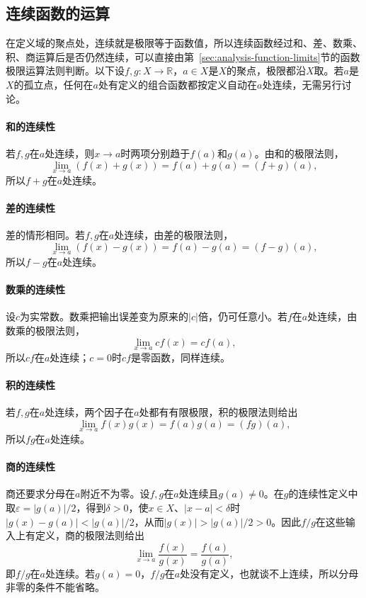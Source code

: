 \subsection{连续函数的运算}

在定义域的聚点处，连续就是极限等于函数值，所以连续函数经过和、差、数乘、积、商运算后是否仍然连续，可以直接由第~\ref{sec:analysis-function-limits}节的函数极限运算法则判断。以下设$f,g:X\to\mathbb R$，$a\in X$是$X$的聚点，极限都沿$X$取。若$a$是$X$的孤立点，任何在$a$处有定义的组合函数都按定义自动在$a$处连续，无需另行讨论。

\paragraph{和的连续性}
若$f,g$在$a$处连续，则$x\to a$时两项分别趋于$f(a)$和$g(a)$。由和的极限法则，
\[
 \lim_{x\to a}(f(x)+g(x))=f(a)+g(a)=(f+g)(a),
\]
所以$f+g$在$a$处连续。

\paragraph{差的连续性}
差的情形相同。若$f,g$在$a$处连续，由差的极限法则，
\[
 \lim_{x\to a}(f(x)-g(x))=f(a)-g(a)=(f-g)(a),
\]
所以$f-g$在$a$处连续。

\paragraph{数乘的连续性}
设$c$为实常数。数乘把输出误差变为原来的$|c|$倍，仍可任意小。若$f$在$a$处连续，由数乘的极限法则，
\[
 \lim_{x\to a}cf(x)=cf(a),
\]
所以$cf$在$a$处连续；$c=0$时$cf$是零函数，同样连续。

\paragraph{积的连续性}
若$f,g$在$a$处连续，两个因子在$a$处都有有限极限，积的极限法则给出
\[
 \lim_{x\to a}f(x)g(x)=f(a)g(a)=(fg)(a),
\]
所以$fg$在$a$处连续。

\paragraph{商的连续性}
商还要求分母在$a$附近不为零。设$f,g$在$a$处连续且$g(a)\neq0$。在$g$的连续性定义中取$\varepsilon=|g(a)|/2$，得到$\delta>0$，使$x\in X$、$|x-a|<\delta$时$|g(x)-g(a)|<|g(a)|/2$，从而$|g(x)|>|g(a)|/2>0$。因此$f/g$在这些输入上有定义，商的极限法则给出
\[
 \lim_{x\to a}\frac{f(x)}{g(x)}=\frac{f(a)}{g(a)},
\]
即$f/g$在$a$处连续。若$g(a)=0$，$f/g$在$a$处没有定义，也就谈不上连续，所以分母非零的条件不能省略。

